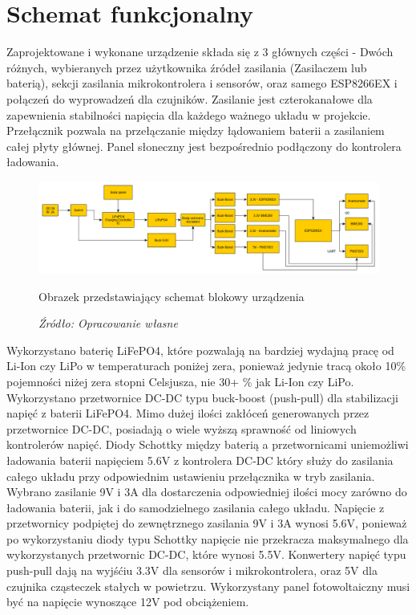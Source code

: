 \documentclass[12pt,a4paper,oneside]{memoir}
\begin{document}
\chapter{Schemat funkcjonalny}
\par Zaprojektowane i wykonane urządzenie składa się z 3 głównych części - Dwóch różnych, wybieranych przez użytkownika źródeł zasilania (Zasilaczem lub baterią), sekcji zasilania mikrokontrolera i sensorów, oraz samego ESP8266EX i połączeń do wyprowadzeń dla czujników. Zasilanie jest czterokanałowe dla zapewnienia stabilności napięcia dla każdego ważnego układu w projekcie. Przełącznik pozwala na przełączanie między łądowaniem baterii a zasilaniem całej płyty głównej. Panel słoneczny jest bezpośrednio podłączony do kontrolera ładowania. 
\begin{figure}[!h]
	\centering
	\includegraphics[scale=0.3]{images/block-schematic.png}
	{\tytulyrozdzialow \footnotesize \caption[Schemat blokowy] {Obrazek przedstawiający schemat blokowy urządzenia}}
	\caption*{\textit{Źródło: Opracowanie własne}}
\end{figure}
\par Wykorzystano baterię LiFePO4, które pozwalają na bardziej wydajną pracę od Li-Ion czy LiPo w temperaturach poniżej zera, ponieważ jedynie tracą około 10\% pojemności niżej zera stopni Celsjusza, nie 30+ \% jak Li-Ion czy LiPo. Wykorzystano przetwornice DC-DC typu buck-boost (push-pull) dla stabilizacji napięć z baterii LiFePO4. Mimo dużej ilości zakłóceń generowanych przez przetwornice DC-DC, posiadają o wiele wyższą sprawność od liniowych kontrolerów napięć. Diody Schottky między baterią a przetwornicami uniemożliwi ładowania baterii napięciem 5.6V z kontrolera DC-DC który służy do zasilania całego układu przy odpowiednim ustawieniu przełącznika w tryb zasilania. Wybrano zasilanie 9V i 3A dla dostarczenia odpowiedniej ilości mocy zarówno do ładowania baterii, jak i do samodzielnego zasilania całego układu. Napięcie z przetwornicy podpiętej do zewnętrznego zasilania 9V i 3A wynosi 5.6V, ponieważ po wykorzystaniu diody typu Schottky napięcie nie przekracza maksymalnego dla wykorzystanych przetwornic DC-DC, które wynosi 5.5V. Konwertery napięć typu push-pull dają na wyjśćiu 3.3V dla sensorów i mikrokontrolera, oraz 5V dla czujnika cząsteczek stałych w powietrzu. Wykorzystany panel fotowoltaiczny musi być na napięcie wynoszące 12V pod obciążeniem.
\newpage
\end{document}
